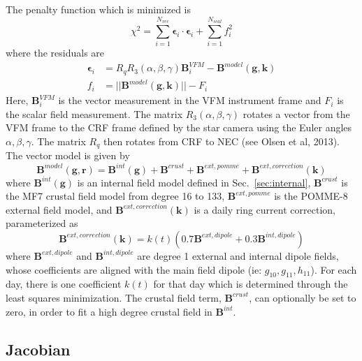 \documentclass{article}
\begin{document}
The penalty function which is minimized is
\begin{equation}
\chi^2 = \sum_{i=1}^{N_{vec}} \boldsymbol{\epsilon}_i \cdot \boldsymbol{\epsilon}_i + \sum_{i=1}^{N_{scal}} f_i^2
\end{equation}
where the residuals are
\begin{align}
\boldsymbol{\epsilon}_i & = R_q R_3(\alpha,\beta,\gamma) \mathbf{B}^{VFM}_i - \mathbf{B}^{model}(\mathbf{g},\mathbf{k}) \\
f_i & = || \mathbf{B}^{model}(\mathbf{g},\mathbf{k}) || - F_i
\end{align}
Here, $\mathbf{B}^{VFM}_i$ is the vector measurement in the VFM instrument frame and $F_i$ is the scalar field
measurement. The matrix $R_3(\alpha,\beta,\gamma)$ rotates a vector from the VFM frame to the CRF frame defined
by the star camera using the Euler angles $\alpha,\beta,\gamma$. The matrix $R_q$ then rotates from CRF to NEC
(see Olsen et al, 2013). The vector model is given by
\begin{equation}
\mathbf{B}^{model}(\mathbf{g},\mathbf{r}) = \mathbf{B}^{int}(\mathbf{g}) + \mathbf{B}^{crust} + \mathbf{B}^{ext,pomme} + \mathbf{B}^{ext,correction}(\mathbf{k})
\end{equation}
where $\mathbf{B}^{int}(\mathbf{g})$ is an internal field model defined in Sec.~\ref{sec:internal},
$\mathbf{B}^{crust}$ is the MF7 crustal field model from degree 16 to 133,
$\mathbf{B}^{ext,pomme}$ is the POMME-8 external field model, and $\mathbf{B}^{ext,correction}(\mathbf{k})$ is a daily
ring current correction, parameterized as
\begin{equation}
\mathbf{B}^{ext,correction}(\mathbf{k}) = k(t) \left( 0.7 \mathbf{B}^{ext,dipole} + 0.3 \mathbf{B}^{int,dipole} \right)
\end{equation}
where $\mathbf{B}^{ext,dipole}$ and $\mathbf{B}^{int,dipole}$ are degree 1 external and internal dipole fields,
whose coefficients are aligned with the main field dipole (ie: $g_{10},g_{11},h_{11}$). For each day, there is
one coefficient $k(t)$ for that day which is determined through the least
squares minimization. The crustal field term, $\mathbf{B}^{crust}$, can
optionally be set to zero, in order to fit a high degree crustal field
in $\mathbf{B}^{int}$.

\subsection{Jacobian}
\end{document}
